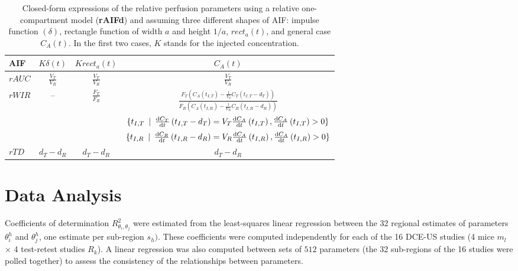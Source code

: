 \begin{table}[!h]
\begin{center}
\begin{tabular}{lccc}
\toprule
AIF & \textbf{$K\delta\left(t\right)$} & $K rect_a\left(t\right)$ & $C_A \left(t\right)$ \\
\midrule
\textbf{$rAUC$} & $\frac{V_T}{V_R}$ & $\frac{V_T}{V_R}$ & $\frac{V_T}{V_R}$\\
\midrule
\multirow{3}{*}{\textbf{$rWIR$}} &  \multirow{3}{*}{--} & \multirow{3}{*}{{$\frac{F_T}{F_R}$}} & $\frac{F_T\left(C_A\left(t_{I,T}\right)-\frac{1}{V_T}C_T\left(t_{I,T} - d_T\right)\right)}{F_R\left(C_A\left(t_{I,R}\right)-\frac{1}{V_R}C_R\left(t_{I,R} - d_R\right)\right)}$ \\
&  & & $\{ t_{I,T} \enskip\vert\enskip \frac{\mathrm d C_T}{\mathrm dt}\left(t_{I,T} - d_T\right) = V_T \frac{\mathrm d C_A}{\mathrm dt}\left(t_{I,T}\right), \frac{\mathrm d C_A}{\mathrm d t}\left(t_{I,T}\right) > 0\}$ \\
&  & & $\{ t_{I,R} \enskip\vert\enskip \frac{\mathrm d C_R}{\mathrm dt}\left(t_{I,R} - d_R\right) = V_R \frac{\mathrm d C_A}{\mathrm dt}\left(t_{I,R}\right), \frac{\mathrm d C_A}{\mathrm d t}\left(t_{I,R}\right) > 0\}$ \\
\midrule
$rTD$ & $d_T - d_R$ & $d_T - d_R$ & $d_T - d_R$ \\
\bottomrule
\end{tabular}
\caption{Closed-form expressions of the relative perfusion parameters using a relative one-compartment model (\textbf{rAIFd}) and assuming three different shapes of AIF: impulse  function $(\delta)$, rectangle function of width $a$ and height $1/a$, $rect_a(t)$, and general case $C_A(t)$. In the first two cases, $K$ stands for the injected concentration.}
\label{tab:AnalyticRelationRelative}
\end{center}
\end{table}

\section{Data Analysis}
Coefficients of determination $R^2_{\theta_{i},\theta_{j}}$ were estimated from the least-squares linear regression between the 32 regional estimates of parameters $\theta_{i}^{h}$ and $\theta_{j}^{h}$, one estimate per sub-region $s_{h})$. These coefficients were computed independently for each of the 16 DCE-US studies (4 mice $m_{l}$ $\times$ 4 test-retest studies $R_{k}$). A linear regression was also computed between sets of $512$ parameters (the 32 sub-regions of the 16 studies were polled together) to assess the consistency of the relationships between parameters. 

